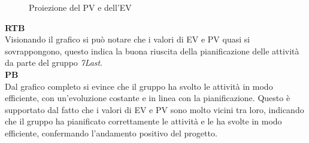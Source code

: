\begin{figure*}[!h]
    \caption{Proiezione del PV e dell'EV}
\end{figure*}

\textbf{RTB} \\
Visionando il grafico si può notare che i valori di EV e PV quasi si sovrappongono, questo indica la buona riuscita della pianificazione delle attività da parte del gruppo \textit{7Last}. \\

\textbf{PB} \\
Dal grafico completo si evince che il gruppo ha svolto le attività in modo efficiente, con un'evoluzione costante e in linea con la pianificazione. Questo è supportato dal fatto che i valori di EV e PV sono molto vicini tra loro, indicando che il gruppo ha pianificato correttamente le attività e le ha svolte in modo efficiente, confermando l'andamento positivo del progetto.

\newpage
